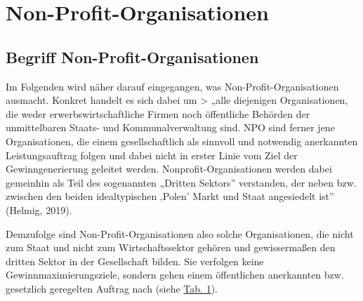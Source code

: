 \documentclass[
  letterpaper,
]{book}
\begin{document}
\section{Non-Profit-Organisationen}\label{npo-organisationen}

\subsection{Begriff Non-Profit-Organisationen}\label{begriffnpo}

Im Folgenden wird näher darauf eingegangen, was
Non-Profit-Organisationen ausmacht. Konkret handelt es sich dabei um
\textgreater{} „alle diejenigen Organisationen, die weder
erwerbswirtschaftliche Firmen noch öffentliche Behörden der
unmittelbaren Staats- und Kommunalverwaltung sind. NPO sind ferner jene
Organisationen, die einem gesellschaftlich als sinnvoll und notwendig
anerkannten Leistungsauftrag folgen und dabei nicht in erster Linie vom
Ziel der Gewinngenerierung geleitet werden. Nonprofit-Organisationen
werden dabei gemeinhin als Teil des sogenannten „Dritten Sektors''
verstanden, der neben bzw. zwischen den beiden idealtypischen ‚Polen'
Markt und Staat angesiedelt ist'' (Helmig, 2019).

Demzufolge sind Non-Profit-Organisationen also solche Organisationen,
die nicht zum Staat und nicht zum Wirtschaftssektor gehören und
gewissermaßen den dritten Sektor in der Gesellschaft bilden. Sie
verfolgen keine Gewinnmaximierungsziele, sondern gehen einem
öffentlichen anerkannten bzw. gesetzlich geregelten Auftrag nach (siehe
\hyperref[table1]{Tab. 1}).
\end{document}

